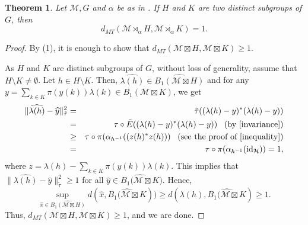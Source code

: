 \documentclass{amsart}
\numberwithin{equation}{section}
\newcommand{\mcal}{\mathcal}
\newcommand{\1}{\mathbf{1}}
\newtheorem{theorem}{Theorem}[section]
\begin{document}
\begin{theorem}
Let $\mcal{M}, G$ and $\alpha$ be as in . If $H$ and $
K$ are two distinct subgroups of $G$, then
\[
d_{MT}(\mcal{M} \rtimes_{\alpha}H, \mcal{M} \rtimes_{\alpha}K)=1.
\]
\end{theorem}
\begin{proof}
By  (1), it is enough to show that $d_{MT}(\mcal{M}\boxtimes
H, \mcal{M}\boxtimes K)\geq 1$.

As $H$ and $K$ are distinct subgroups of $G$, without loss of
generality, assume that $H\setminus K \neq \emptyset$. Let $h\in H
\setminus K$. Then, $\widehat{\lambda(h)}\in \widehat{B_1(\mcal{M}
  \boxtimes H)}$ and for any ${y}= {\sum_{k\in
    K}\pi(y(k))\lambda(k)} \in B_1(\mcal{M} \boxtimes K)$, we
get
\begin{eqnarray*}
\|\widehat{\lambda(h)}-\widehat{y}\|^{2}_{\tilde{\tau}}&=&
\tilde{\tau}((\lambda(h)-y)^*(\lambda(h)-y))\\ &=& \tau\circ
\tilde{E}((\lambda(h)-y)^*(\lambda(h)-y))\,\,\, \, \,(\text{by
  \Cref{invariance}})\\ &\geq&\tau\circ\pi(\alpha_{h^{-1}}((z(h)^*z(h)))\,\,\,
\, \,(\text{see the proof of \Cref{inequality}})\\ &=& \tau \circ \pi
(\alpha_{h^{-1}}(\mathrm{id}_{\mcal{H}}))= 1,
\end{eqnarray*}
where $z= \lambda(h)-\sum_{k\in K}\pi(y(k))\lambda(k)$.  This implies
that $\|\widehat{\lambda(h)}-\widehat{y}\|^{2}_{\tilde{\tau}}\geq 1$
for all $\widehat{y}\in \widehat{B_1(\mcal{M} \boxtimes K})$. Hence,
\[
\sup_{\widehat{x}\in \widehat{B_1(\mcal{M} \boxtimes
    H)}}d(\widehat{x}, \widehat{B_1(\mcal{M} \boxtimes K}))\geq
d(\widehat{\lambda(h)}, \widehat{B_1(\mcal{M} \boxtimes K})\geq 1.
\]
Thus, $d_{MT}(\mcal{M} \boxtimes H, \mcal{M} \boxtimes K)\geq 1$, and
we are done.
\end{proof}

 
\end{document}
